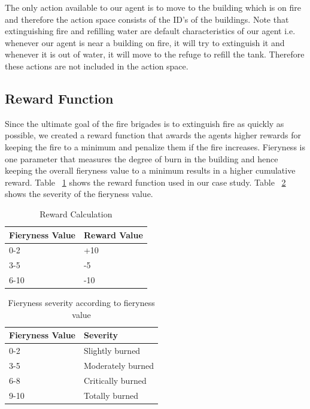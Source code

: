 \documentclass[12pt]{report}
\begin{document}
The only action available to our agent is to move to the building which is on fire and therefore the action space consists of the ID's of the buildings. Note that extinguishing fire and refilling water are default characteristics of our agent i.e. whenever our agent is near a building on fire, it will try to extinguish it and whenever it is out of water, it will move to the refuge to refill the tank. Therefore these actions are not included in the action space. 
    
\subsection{Reward Function}
        
Since the ultimate goal of the fire brigades is to extinguish fire as quickly as possible, we created a reward function that awards the agents higher rewards for keeping the fire to a minimum and penalize them if the fire increases. Fieryness is one parameter that measures the degree of burn in the building and hence keeping the overall fieryness value to a minimum results in a higher cumulative reward. Table ~\ref{table:RewardsTable} shows the reward function used in our case study. Table ~\ref{table:FierynessSeverity} shows the severity of the fieryness value. 
     
\begin{table} [!h]
\begin{center}
 \begin{tabular}{l | l} 
 \hline
 Fieryness Value & Reward Value  \\ [0.5ex] 
 \hline\hline
 0-2 & +10 \\
 3-5 & -5\\
 6-10 & -10  \\ 
 \hline
\end{tabular}
\caption{Reward Calculation}
\label{table:RewardsTable}
\end{center}
\end{table}
 
 
\begin{table} [!h]
\begin{center}
 \begin{tabular}{l | l} 
 \hline
 Fieryness Value & Severity  \\ [0.5ex] 
 \hline\hline
 0-2 & Slightly burned \\
 3-5 & Moderately burned\\
 6-8 & Critically burned\\ 
 9-10 & Totally burned\\
 \hline
\end{tabular}
\caption{Fieryness severity according to fieryness value}
\label{table:FierynessSeverity}
\end{center}
\end{table}
\end{document}
